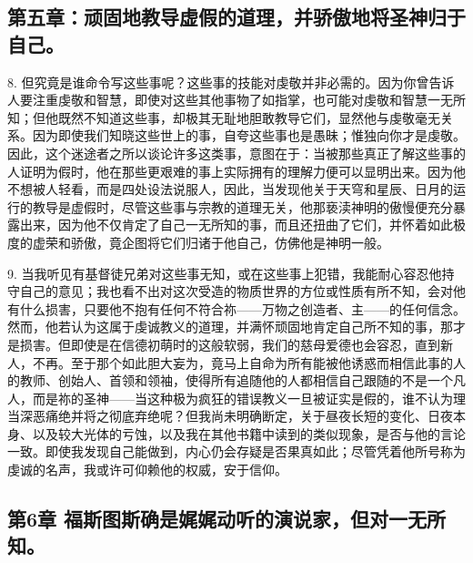 
\subsection{第五章：顽固地教导虚假的道理，并骄傲地将圣神归于自己。}

8. 但究竟是谁命令写这些事呢？这些事的技能对虔敬并非必需的。因为你曾告诉人要注重虔敬和智慧，即使对这些其他事物了如指掌，也可能对虔敬和智慧一无所知；但他既然不知道这些事，却极其无耻地胆敢教导它们，显然他与虔敬毫无关系。因为即使我们知晓这些世上的事，自夸这些事也是愚昧；惟独向你才是虔敬。因此，这个迷途者之所以谈论许多这类事，意图在于：当被那些真正了解这些事的人证明为假时，他在那些更艰难的事上实际拥有的理解力便可以显明出来。因为他不想被人轻看，而是四处设法说服人，因此，当发现他关于天穹和星辰、日月的运行的教导是虚假时，尽管这些事与宗教的道理无关，他那亵渎神明的傲慢便充分暴露出来，因为他不仅肯定了自己一无所知的事，而且还扭曲了它们，并怀着如此极度的虚荣和骄傲，竟企图将它们归诸于他自己，仿佛他是神明一般。\par

9. 当我听见有基督徒兄弟对这些事无知，或在这些事上犯错，我能耐心容忍他持守自己的意见；我也看不出对这次受造的物质世界的方位或性质有所不知，会对他有什么损害，只要他不抱有任何不符合祢——万物之创造者、主——的任何信念。然而，他若认为这属于虔诚教义的道理，并满怀顽固地肯定自己所不知的事，那才是损害。但即使是在信德初萌时的这般软弱，我们的慈母爱德也会容忍，直到新人，不再。至于那个如此胆大妄为，竟马上自命为所有能被他诱惑而相信此事的人的教师、创始人、首领和领袖，使得所有追随他的人都相信自己跟随的不是一个凡人，而是祢的圣神——当这种极为疯狂的错误教义一旦被证实是假的，谁不认为理当深恶痛绝并将之彻底弃绝呢？但我尚未明确断定，关于昼夜长短的变化、日夜本身、以及较大光体的亏蚀，以及我在其他书籍中读到的类似现象，是否与他的言论一致。即使我发现自己能做到，内心仍会存疑是否果真如此；尽管凭着他所号称为虔诚的名声，我或许可仰赖他的权威，安于信仰。\par


\subsection{第6章 福斯图斯确是娓娓动听的演说家，但对一无所知。}

